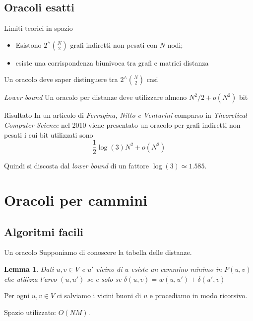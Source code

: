 \documentclass{beamer}
\newcounter{counter1}
\theoremstyle{plain}
\newtheorem{mylem}[counter1]{Lemma}
\theoremstyle{definition}
\theoremstyle{remark}
\newcommand{\pa}[1]{\left(#1\right)}
\begin{document}
\subsection{Oracoli esatti}

\begin{frame}{Limiti teorici in spazio}
  \begin{itemize}
  \item Esistono $2 ^\wedge \binom{ N}{2}$ grafi indiretti non pesati
    con $N$ nodi;
  \item esiste una corrispondenza biunivoca tra grafi e matrici
    distanza
  \end{itemize}
  \pause \vfill

  Un oracolo deve saper distinguere tra $2 ^\wedge {\binom{ N}{2}}$
  casi \pause
  \begin{block}{\textit{Lower bound}}
    Un oracolo per distanze deve utilizzare almeno $N^2 / 2 + o(N^2)$
    bit
  \end{block}
\end{frame}

\begin{frame}{Risultato}
  In un articolo di \textit{Ferragina, Nitto e Venturini} comparso in
  \textit{Theoretical Computer Science} nel 2010 viene presentato un
  oracolo per grafi indiretti non pesati i cui bit utilizzati sono 
  \[ \frac{1}{2} \log \pa{3} N^2 + o\pa{N^2} \]
  \vfill
  
  Quindi si discosta dal \textit{lower bound} di un fattore $\log
  \pa{3} \simeq 1.585$.
\end{frame}

\section{Oracoli per cammini}

\subsection{Algoritmi facili}

\begin{frame}{Un oracolo}
  Supponiamo di conoscere la tabella delle distanze.
  \begin{mylem}
    Dati $u,v \in V$ e $u'$ vicino di $u$ esiste un cammino minimo in
    $P(u,v)$ che utilizza l'arco $(u,u')$ se e solo se $ \delta \pa{
      u,v} = w\pa{ u,u' } + \delta \pa{ u',v} $
  \end{mylem}
  \pause
  Per ogni $u,v\in V$ ci salviamo i vicini buoni di $u$ e procediamo
  in modo ricorsivo.
  \vfill \pause

  Spazio utilizzato: $O\pa{NM}$.
\end{frame}
\end{document}

